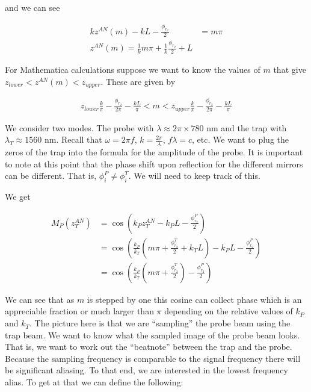 \documentclass[12pt]{article}
\begin{document}
and we can see

\begin{align}
k z^{AN}(m) -kL  - \frac{\phi_{r_2}}{2} &= m\pi\\ 
z^{AN}(m) = \frac{1}{k} m\pi + \frac{1}{k} \frac{\phi_{r_2}}{2} + L
\end{align}

For Mathematica calculations suppose we want to know the values of $m$ that give $z_{lower} < z^{AN}(m) < z_{upper}$. These are given by

\begin{align}
z_{lower} \frac{k}{\pi} - \frac{\phi_{r_2}}{2 \pi} - \frac{kL}{\pi} < m < z_{upper} \frac{k}{\pi} - \frac{\phi_{r_2}}{2 \pi} -\frac{kL}{\pi}
\end{align}

We consider two modes. The probe with $\lambda \approx 2\pi \times 780 \text{ nm}$ and the trap with $\lambda_T \approx 1560 \text{ nm}$. Recall that $\omega = 2\pi f$, $k=\frac{2\pi}{\lambda}$, $f\lambda = c$, etc. We want to plug the zeros of the trap into the formula for the amplitude of the probe. 
It is important to note at this point that the phase shift upon reflection for the different mirrors can be different. That is, $\phi_i^P \neq \phi_i^T$. We will need to keep track of this.

We get

\begin{align}
M_P\left(z^{AN}_T\right) &= \cos\left(k_P z^{AN}_T - k_PL -\frac{\phi_{r_2}^P}{2}\right)\\
&= \cos\left(\frac{k_P}{k_T}\left(m\pi + \frac{\phi_{r_2}^T}{2} + k_T L\right) - k_P L - \frac{\phi_{r_2}^P}{2}\right)\\
&= \cos\left(\frac{k_P}{k_T}\left( m\pi + \frac{\phi_{r_2}^T}{2}\right) - \frac{\phi_{r_2}^P}{2} \right)
\end{align}

We can see that as $m$ is stepped by one this cosine can collect phase which is an appreciable fraction or much larger than $\pi$ depending on the relative values of $k_P$ and $k_T$. The picture here is that we are ``sampling'' the probe beam using the trap beam. We want to know what the sampled image of the probe beam looks. That is, we want to work out the ``beatnote'' between the trap and the probe. Because the sampling frequency is comparable to the signal frequency there will be significant aliasing. To that end, we are interested in the lowest frequency alias. To get at that we can define the following:
\end{document}
